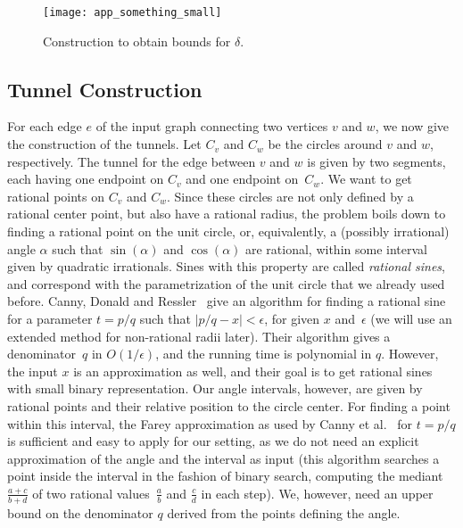 \documentclass[11pt,a4paper]{article}
\begin{document}
\begin{figure}
\centering
\texttt{[image: app\_something\_small]}
\caption{Construction to obtain bounds for $\delta$.}
\label{fig_app_something_small}
\end{figure}


\subsection{Tunnel Construction}
For each edge $e$ of the input graph connecting two vertices $v$ and $w$, we now give the construction of the tunnels.
Let $C_v$ and $C_w$ be the circles around $v$ and $w$, respectively.
The tunnel for the edge between $v$ and $w$ is given by two segments, each having one endpoint on $C_v$ and one endpoint on~$C_w$.
We want to get rational points on $C_v$ and $C_w$.
Since these circles are not only defined by a rational center point, but also have a rational radius, the problem boils down to finding a rational point on the unit circle, or, equivalently, a (possibly irrational) angle $\alpha$ such that $\sin(\alpha)$ and $\cos(\alpha)$ are rational, within some interval given by quadratic irrationals.
Sines with this property are called \emph{rational sines}, and correspond with the parametrization of the unit circle that we already used before.
Canny, Donald and Ressler~\cite{canny} give an algorithm for finding a rational sine for a parameter $t = p/q$ such that $|p/q - x| < \epsilon$, for given $x$ and~$\epsilon$ (we will use an extended method for non-rational radii later).
Their algorithm gives a denominator~$q$ in $O(1/\epsilon)$, and the running time is polynomial in $q$.
However, the input $x$ is an approximation as well, and their goal is to get rational sines with small binary representation.
Our angle intervals, however, are given by rational points and their relative position to the circle center.
For finding a point within this interval, the Farey approximation as used by Canny et al.~\cite{canny} for $t = p/q$ is sufficient and easy to apply for our setting, as we do not need an explicit approximation of the angle and the interval as input (this algorithm searches a point inside the interval in the fashion of binary search, computing the mediant~$\frac{a+c}{b+d}$ of two rational values~$\frac{a}{b}$ and $\frac{c}{d}$ in each step).
We, however, need an upper bound on the denominator $q$ derived from the points defining the angle.
\end{document}
